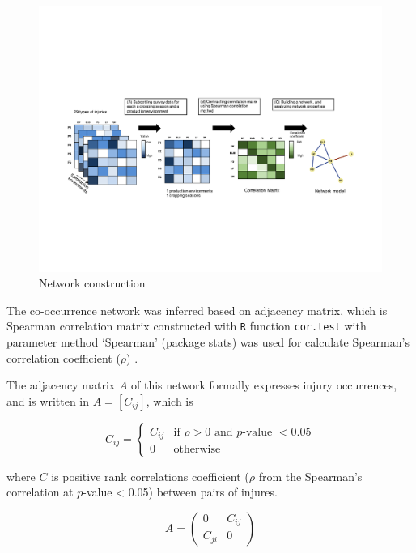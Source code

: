 \begin{figure}
\centering
\includegraphics[width = 1\textwidth]{figures/pipeline2.pdf}
\caption{Network construction}
\label{fig:pipeline2}
\end{figure} 

The co-occurrence network was inferred based on adjacency matrix, which is Spearman correlation matrix constructed with \texttt{R} function \texttt{cor.test} with parameter method `Spearman' (package stats) was used for calculate Spearman's correlation coefficient ($\rho$) \citep{R_2015}.

The adjacency matrix $A$ of this network formally expresses injury occurrences, and is written in $A=[C_{ij}]$, which is

\begin{equation}
C_{ij} = \begin{cases}
C_{ij} & \text{if } \rho > 0  \text{ and }  p\text{-value } < 0.05 \\ 
0 & \text{otherwise}
\end{cases}
\end{equation}

where $C$ is positive rank correlations coefficient ($\rho$ from the Spearman’s correlation at $p$-value < 0.05) between pairs of injures.

\begin{equation}
A = \begin{pmatrix}
0 & C_{ij}\\ 
C_{ji} & 0
\end{pmatrix}
\end{equation}

